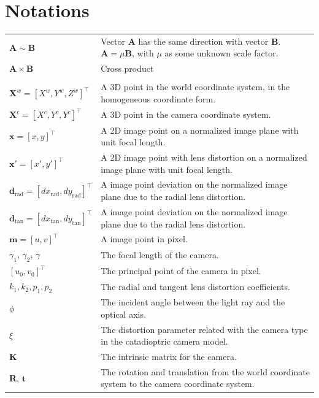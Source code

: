 \documentclass{report}
\begin{document}
\chapter{Notations}
\begin{supertabular}{p{0.3\textwidth}p{0.67\textwidth}}
$\mathbf{A} \sim \mathbf{B}$ & Vector $\mathbf{A}$ has the same direction with vector $\mathbf{B}$. $\mathbf{A} = \mu \mathbf{B}$, with $\mu$ as some unknown scale factor.  \\[8pt]
$\mathbf{A} \times \mathbf{B}$ & Cross product \\[8pt]
\hline\\[4pt]
$\mathbf{X}^w = [X^w, Y^w, Z^w]^\top$ & A 3D point in the world coordinate system, in the homogeneous coordinate form.\\[8pt]
$\mathbf{X}^c = [X^c, Y^c, Y^c]^\top$ & A 3D point in the camera coordinate system. \\[8pt]
$\mathbf{x} = [x, y]^\top$ & A 2D image point on a normalized image plane with unit focal length. \\[8pt]
$\mathbf{x}' = [x', y']^\top$ & A 2D image point with lens distortion on a normalized image plane with unit focal length. \\[8pt]

$\mathbf{d}_\text{rad} = [dx_\text{rad}, dy_\text{rad}]^\top$ & A image point deviation on the normalized image plane due to the radial lens distortion. \\[8pt]
$\mathbf{d}_\text{tan} = [dx_\text{tan}, dy_\text{tan}]^\top$ & A image point deviation on the normalized image plane due to the radial lens distortion. \\[8pt]
$\mathbf{m} = [u, v]^\top$ & A image point in pixel. \\[8pt]
$\gamma_1$, $\gamma_2$, $\gamma$ & The focal length of the camera. \\[8pt]
$[u_0, v_0]^\top$ & The principal point of the camera in pixel. \\[8pt]
$k_1, k_2, p_1, p_2$ & The radial and tangent lens distortion coefficients. \\[8pt]
$\phi$ & The incident angle between the light ray and the optical axis. \\[8pt]
$\xi$ & The distortion parameter related with the camera type in the catadioptric camera model. \\[8pt]
$\mathbf{K}$ & The intrinsic matrix for the camera. \\[8pt]
$\mathbf{R}$, $\mathbf{t}$ & The rotation and translation from the world coordinate system to the camera coordinate system. \\[8pt]


\end{supertabular}
\end{document}
